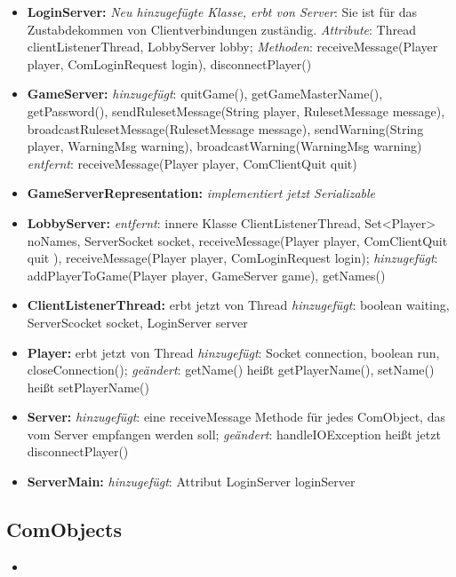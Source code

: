 \documentclass{article}
\begin{document}
\begin{itemize}
\item  \textbf{LoginServer:}  \textit{Neu hinzugefügte Klasse, erbt von Server}: Sie ist für das Zustabdekommen von Clientverbindungen zuständig. \textit{Attribute}:  Thread clientListenerThread,  LobbyServer lobby; \textit{Methoden}: receiveMessage(Player player, ComLoginRequest login), disconnectPlayer()
\item  \textbf{GameServer:} \textit{hinzugefügt}: quitGame(), getGameMasterName(), getPassword(), sendRulesetMessage(String player, RulesetMessage message), broadcastRulesetMessage(RulesetMessage message), sendWarning(String player, WarningMsg warning), broadcastWarning(WarningMsg warning) \textit{entfernt}: receiveMessage(Player player, ComClientQuit quit)
\item  \textbf{GameServerRepresentation:} \textit{implementiert jetzt Serializable}
\item  \textbf{LobbyServer:} \textit{entfernt}: innere Klasse ClientListenerThread, Set<Player> noNames, ServerSocket socket, receiveMessage(Player player, ComClientQuit quit ), receiveMessage(Player player, ComLoginRequest login); \textit{hinzugefügt}: addPlayerToGame(Player player, GameServer game), getNames()
\item  \textbf{ClientListenerThread:} erbt jetzt von Thread  \textit{hinzugefügt}: boolean waiting, ServerScocket socket, LoginServer server
\item  \textbf{Player:}  erbt jetzt von Thread  \textit{hinzugefügt}: Socket connection, boolean run, closeConnection(); \textit{geändert}: getName() heißt getPlayerName(), setName() heißt setPlayerName()
\item  \textbf{Server:} \textit{hinzugefügt}: eine receiveMessage Methode für jedes ComObject, das vom Server empfangen werden soll; \textit{geändert}: handleIOException heißt jetzt disconnectPlayer()
\item  \textbf{ServerMain:} \textit{hinzugefügt}: Attribut LoginServer loginServer
\end{itemize}

\subsection{ComObjects}

\begin{itemize}
\item 
\end{itemize}

\newpage
\end{document}
